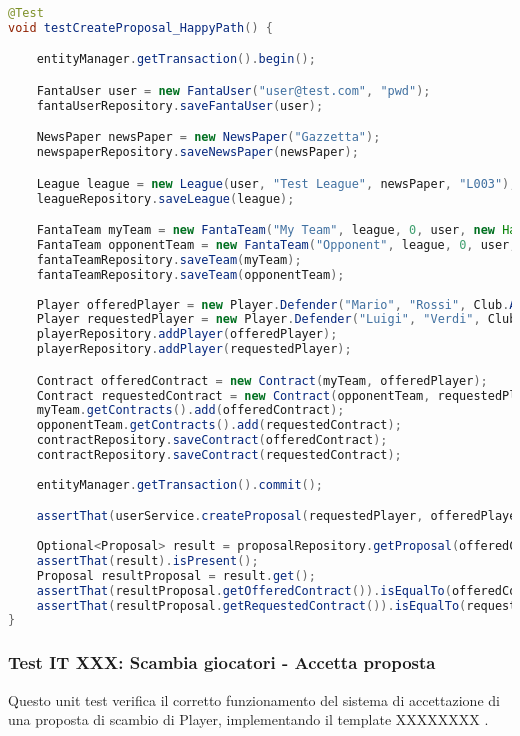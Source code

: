 \begin{lstlisting}[language=Java]
@Test
void testCreateProposal_HappyPath() {

	entityManager.getTransaction().begin();

	FantaUser user = new FantaUser("user@test.com", "pwd");
	fantaUserRepository.saveFantaUser(user);

	NewsPaper newsPaper = new NewsPaper("Gazzetta");
	newspaperRepository.saveNewsPaper(newsPaper);

	League league = new League(user, "Test League", newsPaper, "L003");
	leagueRepository.saveLeague(league);

    FantaTeam myTeam = new FantaTeam("My Team", league, 0, user, new HashSet<>());
    FantaTeam opponentTeam = new FantaTeam("Opponent", league, 0, user, new HashSet<>());
	fantaTeamRepository.saveTeam(myTeam);
	fantaTeamRepository.saveTeam(opponentTeam);
		
	Player offeredPlayer = new Player.Defender("Mario", "Rossi", Club.ATALANTA);
	Player requestedPlayer = new Player.Defender("Luigi", "Verdi", Club.BOLOGNA);
	playerRepository.addPlayer(offeredPlayer);
	playerRepository.addPlayer(requestedPlayer);

	Contract offeredContract = new Contract(myTeam, offeredPlayer);
	Contract requestedContract = new Contract(opponentTeam, requestedPlayer);
	myTeam.getContracts().add(offeredContract);
	opponentTeam.getContracts().add(requestedContract);
	contractRepository.saveContract(offeredContract);
	contractRepository.saveContract(requestedContract);
		
	entityManager.getTransaction().commit();

	assertThat(userService.createProposal(requestedPlayer, offeredPlayer, myTeam, opponentTeam)).isTrue();
		
	Optional<Proposal> result = proposalRepository.getProposal(offeredContract, requestedContract);
	assertThat(result).isPresent();
	Proposal resultProposal = result.get();
	assertThat(resultProposal.getOfferedContract()).isEqualTo(offeredContract);
	assertThat(resultProposal.getRequestedContract()).isEqualTo(requestedContract);
}
\end{lstlisting}


\subsubsection{Test IT XXX: Scambia giocatori - Accetta proposta}

Questo unit test verifica il corretto funzionamento del sistema di accettazione di una proposta di scambio di Player,
implementando il template XXXXXXXX .

